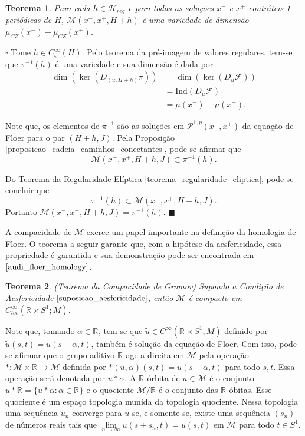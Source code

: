 \documentclass[12pt]{book}
\newtheorem{teorema}{Teorema}[section]
\newenvironment{prova}[1]{$\square$ #1}{\hfill$\blacksquare$}
\newcommand{\aplicaoessuaves}[2]{C^{\infty}(#1, #2)}
\newcommand{\caminhosexponenciaisconectantes}[2]{\mathcal{P}^{1,p}(#1, #2)}
\newcommand{\caminhosexponenciaisconectantespadrao}{\caminhosexponenciaisconectantes{x^{-}}{x^{+}}}
\newcommand{\circulo}{S^{1}}
\newcommand{\diferencialfloerponto}[1]{D_{#1}\operadorFloer}
\newcommand{\energiafinitaM}{\mathcal{M}}
\newcommand{\energiafinitaMconectanteHamiltoniana}{\energiafinitaM(x^{-}, x^{+},H+h,J)}
\newcommand{\hamiltonianasRegulares}{\mathcal{H}_{reg}}
\newcommand{\iconley}[1]{\iconleyabrev(#1)}
\newcommand{\iconleyabrev}{\mu_{CZ}}
\newcommand{\ind}{\text{Ind}}
\newcommand{\operadorFloer}{\mathcal{F}}
\newcommand{\perturbacaoHamiltoniana}[1]{C^{\infty}_{\epsilon}(#1)}
\newcommand{\retacartesianocirculo}{\real{} \times \circulo}
\newcommand{\real}[1]{\mathbb{R}^{#1}}
\newcommand{\reta}{\real{}}
\begin{document}
	\begin{teorema}\label{teorema_variedade_espaco_trajetoria}
		Para cada $h \in \hamiltonianasRegulares$ e para todas as soluções $x^{-}$ e $x^{+}$ contráteis 1-periódicas de $H$, $\energiafinitaM(x^{-}, x^{+}, H+h)$ é uma variedade de dimensão $\iconley{x^{-}}-\iconley{x^{+}}$.
	\end{teorema}
	\begin{prova} Tome $h \in \perturbacaoHamiltoniana{H}$. Pelo teorema da pré-imagem de valores regulares, tem-se que $\pi^{-1}(h)$ é uma variedade e sua dimensão é dada por
			$$
			\begin{aligned}
			\dim(\ker(D_{(u, H+h)}\pi)) &= \dim(\ker(\diferencialfloerponto{u}))
			\\
			&=\ind{(\diferencialfloerponto{u})}
			\\
			&=\mu(x^{-})-\mu(x^{+}).
			\end{aligned}
			$$
			
			Note que, os elementos de $\pi^{-1}$ são as soluções em $\caminhosexponenciaisconectantespadrao$ da equação de Floer para o par $(H+h, J)$. Pela Proposição \ref{proposicao_cadeia_caminhos_conectantes}, pode-se afirmar que 
			$$
			\energiafinitaMconectanteHamiltoniana \subset\pi^{-1}(h).
			$$
			
			Do Teorema da Regularidade Elíptica \ref{teorema_regularidade_eliptica}, pode-se concluir que 
			$$
			\pi^{-1}(h) \subset\energiafinitaMconectanteHamiltoniana.
			$$
			Portanto $\energiafinitaMconectanteHamiltoniana =\pi^{-1}(h)$.
	\end{prova}
	
	A compacidade de $\energiafinitaM$ exerce um papel importante na definição da homologia de Floer. O teorema a seguir garante que, com a hipótese da aesfericidade, essa propriedade é garantida e sua demonstração pode ser encontrada em $\cite{audi_floer_homology}$.
	
	\begin{teorema}\label{teorema_compacidade_gromov}
		(Teorema da Compacidade de Gromov) Supondo a Condição de Aesfericidade $\ref{suposicao_aesfericidade}$, então $\energiafinitaM$ é compacto em $C^{\infty}_{loc}(\retacartesianocirculo; M)$.
	\end{teorema}
	
	
	Note que, tomando $\alpha\in \reta$, tem-se que $\tilde{u}\in \aplicaoessuaves{\retacartesianocirculo}{M}$ definido por $ \tilde{u}(s,t)=u(s+\alpha,t)$, também é solução da equação de Floer. Com isso, pode-se afirmar que o grupo aditivo $\reta$ age a direita em $\energiafinitaM$ pela operação $*:\energiafinitaM\times \reta\to \energiafinitaM$ definida por $*(u,\alpha)(s,t) = u(s+\alpha,t)$ para todo $s,t$. Essa operação será denotada por $u*\alpha$. A $\reta$-órbita de $u \in \energiafinitaM$ é o conjunto $u*\reta = \{u*\alpha  : \alpha\in \reta\}$ e o quociente $\energiafinitaM/\reta$ é o conjunto das $\reta$-óbitas. Esse quociente é um espaço topologia munida da topologia quociente. Nessa topologia uma sequência $\tilde{u}_{n}$ converge para $\tilde{u}$ se, e somente se, existe uma sequência $(s_{n})$ de números reais tais que $\lim\limits_{n\to \infty}u(s+s_{n}, t) = u(s,t)$ em $\energiafinitaM$ para todo $t \in \circulo$.
	
\end{document}
